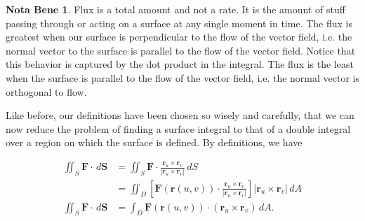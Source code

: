 \documentclass[11pt,oneside,english]{amsart}
\theoremstyle{definition}
\newtheorem*{note}{Nota Bene}
\begin{document}
\begin{note}
Flux is a total amount and not a rate. It is the amount of stuff passing through or acting on a surface at any single moment in time. The flux is greatest when our surface is perpendicular to the flow of the vector field, i.e. the normal vector to the surface is parallel to the flow of the vector field. Notice that this behavior is captured by the dot product in the integral. The flux is the least when the surface is parallel to the flow of the vector field, i.e. the normal vector is orthogonal to flow.
\end{note}


Like before, our definitions have been chosen so wisely and carefully, that we can now reduce the problem of finding a surface integral to that of a double integral over a region on which the surface is defined. By definitions, we have


\begin{align*}
\iint_S \mathbf{F}\cdot\,d\mathbf{S}&=\iint_S\mathbf{F}\cdot\frac{\mathbf{r}_u\times\mathbf{r}_v}{|\mathbf{r}_u\times\mathbf{r}_v|}\,dS\\[2mm]
&=\iint_D\left[\mathbf{F}(\mathbf{r}(u,v))\cdot\frac{\mathbf{r}_u\times\mathbf{r}_v}{|\mathbf{r}_u\times\mathbf{r}_v|}\right]|\mathbf{r}_u\times\mathbf{r}_v|\,dA\\[2mm]
\iint_S \mathbf{F}\cdot\,d\mathbf{S}&=\int_D\mathbf{F}(\mathbf{r}(u,v))\cdot(\mathbf{r}_u\times\mathbf{r}_v)\,dA.
\end{align*}
\end{document}
